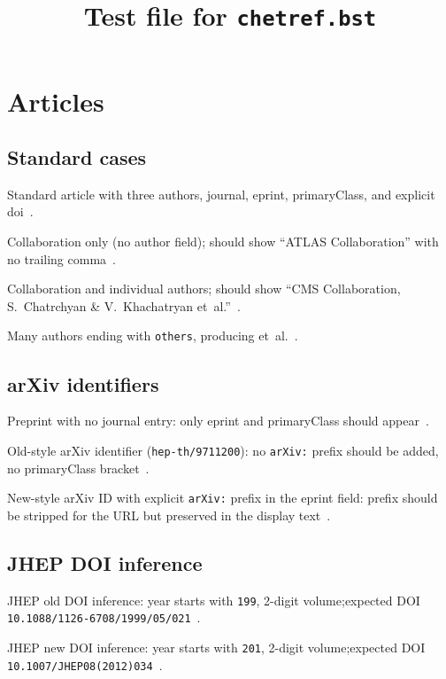 \documentclass[12pt]{article}
\title{Test file for \texttt{chetref.bst}}
\author{}
\date{}
\begin{document}
\maketitle
\tableofcontents

\section{Articles}

\subsection{Standard cases}

Standard article with three authors, journal, eprint, primaryClass, and explicit doi~\cite{standard}.

Collaboration only (no author field); should show ``ATLAS Collaboration'' with no trailing comma~\cite{collab_only}.

Collaboration and individual authors; should show ``CMS Collaboration, S.~Chatrchyan \& V.~Khachatryan et~al.''~\cite{collab_and_author}.

Many authors ending with \texttt{others}, producing et~al.~\cite{many_authors}.

\subsection{arXiv identifiers}

Preprint with no journal entry: only eprint and primaryClass should appear~\cite{preprint_only}.

Old-style arXiv identifier (\texttt{hep-th/9711200}): no \texttt{arXiv:} prefix should be added, no primaryClass bracket~\cite{old_arxiv}.

New-style arXiv ID with explicit \texttt{arXiv:} prefix in the eprint field: prefix should be stripped for the URL but preserved in the display text~\cite{arxiv_prefix}.

\subsection{JHEP DOI inference}

JHEP old DOI inference: year starts with \texttt{199}, 2-digit volume;\newline expected DOI \texttt{10.1088/1126-6708/1999/05/021}~\cite{jhep_old_doi}.

JHEP new DOI inference: year starts with \texttt{201}, 2-digit volume;\newline expected DOI \texttt{10.1007/JHEP08(2012)034}~\cite{jhep_new_doi}.
\end{document}
